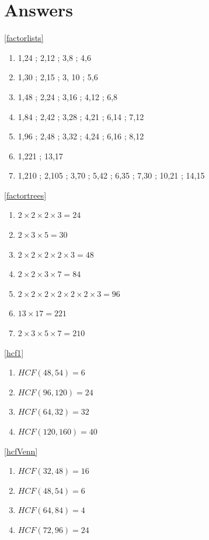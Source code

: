 \documentclass[a4paper,12pt]{article}
\begin{document}
\section{Answers}
\footnotesize
\ref{factorlists}
\begin{multicols}{4}
	\begin{enumerate}[label= \roman*)]
		\item 1,24 ; 2,12 ; 3,8 ; 4,6 
		\item 1,30 ; 2,15 ; 3, 10 ; 5,6 
		\item 1,48 ; 2,24 ; 3,16 ; 4,12 ; 6,8
		\item 1,84 ; 2,42 ; 3,28 ; 4,21 ; 6,14 ; 7,12  
		\item 1,96 ; 2,48 ; 3,32 ; 4,24 ; 6,16 ; 8,12
		\item 1,221 ; 13,17   
		\item 1,210 ; 2,105 ; 3,70 ; 5,42 ; 6,35 ; 7,30 ; 10,21 ; 14,15
	\end{enumerate}
\end{multicols}
\ref{factortrees}
\begin{multicols}{4}
	\begin{enumerate}[label= \roman*)]
		\item $2\times2\times2\times3=24$
		\item $2\times 3\times5=30$ 
		\item $2\times 2\times2\times2\times3=48$
		\item $2\times 2\times3\times7=84$  
		\item $2\times 2\times2\times2\times2\times2\times3=96$
		\item $13\times17=221$   
		\item $2\times3\times5\times7=210$
	\end{enumerate}
\end{multicols}
\ref{hcf1}
\begin{multicols}{4}
	\begin{enumerate}[label= \roman*)]
		\item $HCF(48,54)=6$
		\item $HCF(96,120)=24$ 
		\item $HCF(64,32)=32$
		\item $HCF(120,160)=40$  
	\end{enumerate}
\end{multicols}
\ref{hcfVenn}
\begin{multicols}{4}
	\begin{enumerate}[label= \roman*)]
		\item $HCF(32,48)=16$
		\item $HCF(48,54)=6$ 
		\item $HCF(64,84)=4$
		\item $HCF(72,96)=24$  
	\end{enumerate}
\end{multicols}
\end{document}
